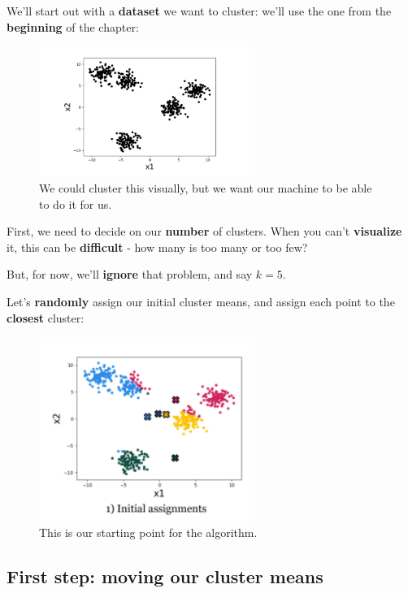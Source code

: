         We'll start out with a \textbf{dataset} we want to cluster: we'll use the one from the \textbf{beginning} of the chapter:
        
        \begin{figure}[H]
            \centering
            \includegraphics[width=70mm,scale=0.4]{images/clustering_images/clustering_example.png}
            \caption*{We could cluster this visually, but we want our machine to be able to do it for us.}
        \end{figure}
        
        First, we need to decide on our \textbf{number} of clusters. When you can't \textbf{visualize} it, this can be \textbf{difficult} - how many is too many or too few? 
        
        But, for now, we'll \textbf{ignore} that problem, and say $k=5$. 
        
        Let's \textbf{randomly} assign our initial cluster means, and assign each point to the \textbf{closest} cluster:
        
        \begin{figure}[H]
            \centering
            \includegraphics[width=70mm,scale=0.4]{images/clustering_images/initialization_cluster.png}
            \caption*{This is our starting point for the algorithm.}
        \end{figure}
    
    \subsection{First step: moving our cluster means}
    
